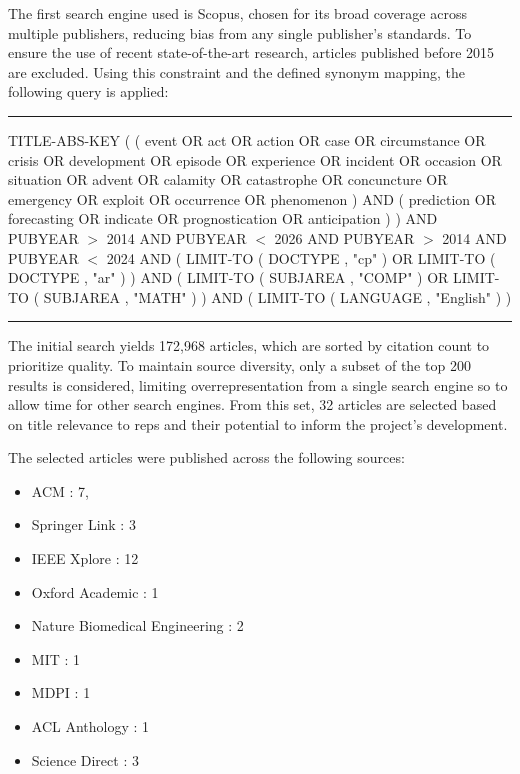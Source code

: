 	The first search engine used is Scopus, chosen for its broad coverage across multiple publishers, reducing bias from any single publisher's standards. To ensure the use of recent state-of-the-art research, articles published before 2015 are excluded. Using this constraint and the defined synonym mapping, the following query is applied:\newline\noindent\rule{\textwidth}{0.4pt}\newline
	TITLE-ABS-KEY ( ( event OR act OR action OR case OR circumstance OR crisis OR development OR episode OR experience OR incident OR occasion OR situation OR advent OR calamity OR catastrophe OR concuncture OR emergency OR exploit OR occurrence OR phenomenon ) AND ( prediction OR forecasting OR indicate OR prognostication OR anticipation ) ) AND PUBYEAR $>$ 2014 AND PUBYEAR $<$ 2026 AND PUBYEAR $>$ 2014 AND PUBYEAR $<$ 2024 AND ( LIMIT-TO ( DOCTYPE , "cp" ) OR LIMIT-TO ( DOCTYPE , "ar" ) ) AND ( LIMIT-TO ( SUBJAREA , "COMP" ) OR LIMIT-TO ( SUBJAREA , "MATH" ) ) AND ( LIMIT-TO ( LANGUAGE , "English" ) )
	\newline
	\newline\noindent\rule{\textwidth}{0.4pt}\newline\newpage
	The initial search yields 172,968 articles, which are sorted by citation count to prioritize quality. To maintain source diversity, only a subset of the top 200 results is considered, limiting overrepresentation from a single search engine so to allow time for other search engines. From this set, 32 articles are selected based on title relevance to \gls{reps} and their potential to inform the project's development.

	The selected articles were published across the following sources:
	\begin{itemize}
		\item ACM : 7,
		\item Springer Link : 3
		\item IEEE Xplore : 12
		\item Oxford Academic : 1
		\item Nature Biomedical Engineering : 2
		\item MIT : 1
		\item MDPI : 1
		\item ACL Anthology : 1
		\item Science Direct : 3
	\end{itemize}
	
